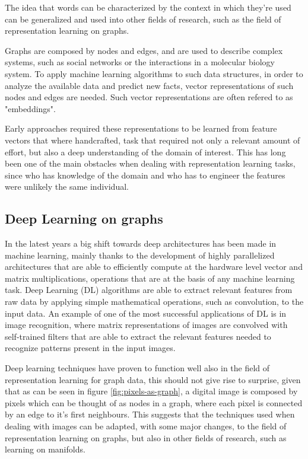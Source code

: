 \documentclass[%
    corpo=13.5pt,
    twoside,
    oldstyle,
    tipotesi=magistrale,
    greek,
    evenboxes
]{toptesi}
\begin{document}
The idea that words can be characterized by the context in which they're used
can be generalized and used into other fields of research, such as
the field of representation learning on graphs.

Graphs are composed by nodes and edges, and are used to describe complex
systems, such as social networks or the interactions in a molecular biology
system. To apply machine learning algorithms to such data structures, in order
to analyze the available data and predict new facts, vector representations of
such nodes and edges are needed. Such vector representations are often
refered to as "embeddings".

Early approaches required these representations to be learned from feature
vectors that where handcrafted, task that required not
only a relevant amount of effort, but also a deep understanding of the domain
of interest. This has long been one of the main obstacles when dealing with
representation learning tasks, since who has knowledge of the domain and who
has to engineer the features were unlikely the same individual.


\subsection{Deep Learning on graphs}

In the latest years a big shift towards deep architectures has been made
in machine learning, mainly thanks to the development of highly
parallelized architectures that are able to efficiently compute
at the hardware level vector and matrix multiplications, operations that
are at the basis of any machine learning task.
Deep Learning (DL) algorithms are able to extract relevant features from
raw data by applying simple mathematical operations, such as convolution, to
the input data.
An example of one of the most successful applications of DL is in
image recognition, where matrix representations of images are
convolved with self-trained filters that are able to
extract the relevant features needed to recognize patterns present
in the input images.

Deep learning techniques have proven to function well also in the field of
representation learning for graph data, this should not give rise to surprise,
given that as can be seen in figure \ref{fig:pixels-as-graph}, a digital image
is composed by pixels which can be thought of as nodes in a graph, where
each pixel is connected by an edge to it's first neighbours. This suggests that
the techniques used when dealing with images can be adapted, with
some major changes, to the field of representation learning on graphs, but
also in other fields of research, such as learning on manifolds.
\end{document}
